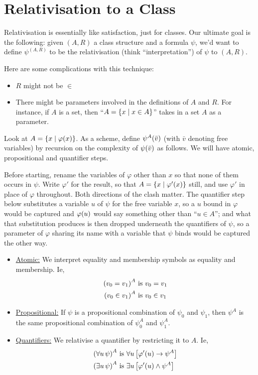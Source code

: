 \section{Relativisation to a Class}

Relativisation is essentially like satisfaction, just for classes. Our ultimate goal is the following: given $(A, R)$ a class structure and a formula $\psi$, we'd want to define $\psi^{(A, R)}$ to be the relativisation (think ``interpretation'') of $\psi$ to $(A, R)$.

Here are some complications with this technique:
\begin{itemize}
    \item $R$ might not be $\in$
    \item There might be parameters involved in the definitions of $A$ and $R$. For instance, if $A$ is a set, then ``$A = \left\{ x \; \middle\vert \; x \in A \right\}$'' takes in a set $A$ as a parameter.
\end{itemize}

Look at $A = \left\{ x \; \middle\vert \; \varphi(x) \right\}$. As a scheme, define $\psi^A\!\left( \bar{v} \right)$ (with $\bar{v}$ denoting free variables) by recursion on the complexity of $\psi\!\left( \bar{v} \right)$ as follows. We will have atomic, propositional and quantifier steps.

Before starting, rename the variables of $\varphi$ other than $x$ so that none of them occurs in $\psi$. Write $\varphi'$ for the result, so that $A = \left\{ x \; \middle\vert \; \varphi'(x) \right\}$ still, and use $\varphi'$ in place of $\varphi$ throughout. Both directions of the clash matter. The quantifier step below substitutes a variable $u$ of $\psi$ for the free variable $x$, so a $u$ bound in $\varphi$ would be captured and $\varphi\!\left( u \right)$ would say something other than ``$u \in A$''; and what that substitution produces is then dropped underneath the quantifiers of $\psi$, so a parameter of $\varphi$ sharing its name with a variable that $\psi$ binds would be captured the other way.
\begin{itemize}
    \item \underline{Atomic:} We interpret equality and membership symbols as equality and membership. Ie,
    \begin{align*}
        \left( v_0 = v_1 \right)^A &\text{ is } v_0 = v_1 \\
        \left( v_0 \in v_1 \right)^A &\text{ is } v_0 \in v_1 
    \end{align*}

    \item \underline{Propositional:} If $\psi$ is a propositional combination of $\psi_0$ and $\psi_1$, then $\psi^A$ is the same propositional combination of $\psi_0^A$ and $\psi_1^A$.

    \item \underline{Quantifiers:} We relativise a quantifier by restricting it to $A$. Ie,
    \begin{align*}
        \left( \forall u \, \psi \right)^A &\text{ is } \forall u \left[ \varphi'(u) \to \psi^A \right] \\
        \left( \exists u \, \psi \right)^A &\text{ is } \exists u \left[ \varphi'(u) \land \psi^A \right]
    \end{align*}
\end{itemize}

